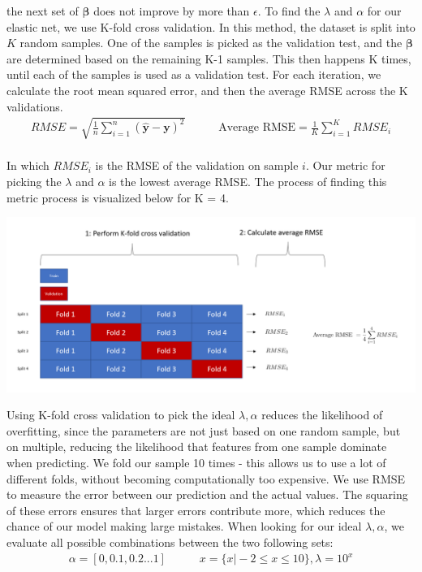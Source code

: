 \documentclass[
]{article}
\begin{document}
the next set of \(\boldsymbol{\beta}\) does not improve by more than
\(\epsilon\). To find the \(\lambda\) and \(\alpha\) for our elastic
net, we use K-fold cross validation. In this method, the dataset is
split into \(K\) random samples. One of the samples is picked as the
validation test, and the \(\boldsymbol{\beta}\) are determined based on
the remaining K-1 samples. This then happens K times, until each of the
samples is used as a validation test. For each iteration, we calculate
the root mean squared error, and then the average RMSE across the K
validations. \begin{align*}
    RMSE = \sqrt{ \frac{1}{n} \sum_{i=1}^{n} (\hat{\boldsymbol{y}} - \boldsymbol{y})^2 } \hspace{35pt} \text{Average RMSE} = \frac{1}{K}\sum_{i=1}^{K} RMSE_i 
\end{align*}\\
In which \(RMSE_i\) is the RMSE of the validation on sample \(i\). Our
metric for picking the \(\lambda\) and \(\alpha\) is the lowest average
RMSE. The process of finding this metric process is visualized below for
K = 4.

\includegraphics[]{kfold.PNG}

Using K-fold cross validation to pick the ideal \(\lambda, \alpha\)
reduces the likelihood of overfitting, since the parameters are not just
based on one random sample, but on multiple, reducing the likelihood
that features from one sample dominate when predicting. We fold our
sample 10 times - this allows us to use a lot of different folds,
without becoming computationally too expensive. We use RMSE to measure
the error between our prediction and the actual values. The squaring of
these errors ensures that larger errors contribute more, which reduces
the chance of our model making large mistakes. When looking for our
ideal \(\lambda, \alpha\), we evaluate all possible combinations between
the two following sets: \begin{align*}
    \alpha = [0,0.1,0.2...1] \hspace{35pt} x = \{x   \vert -2 \leq x \leq 10\} , \lambda = 10^x\\
\end{align*}
\end{document}
